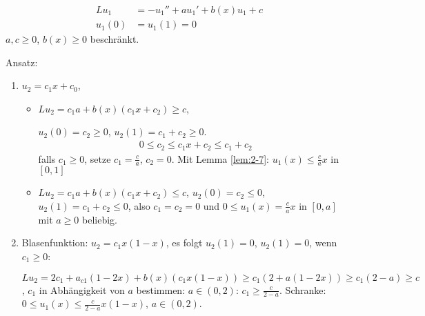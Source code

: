 \begin{beispiel}
  \begin{align*}
    Lu_{1} &= -u_{1}'' + au_{1}' + b(x)u_{1} + c\\
    u_{1}(0) &= u_{1}(1) = 0
  \end{align*}
$a, c \geq 0$, $b(x) \geq 0$ beschränkt. 

Ansatz:
\begin{enumerate}
\item $u_{2} = c_{1}x + c_{0}$,
  \begin{itemize}
  \item $Lu_{2} = c_{1} a + b(x)(c_{1}x + c_{2})\geq c$,

$u_{2}(0) = c_{2} \geq 0$, $u_{2}(1) = c_{1} + c_{2} \geq 0$.
\begin{align*}
  0 \leq c_{2} \leq c_{1}x + c_{2}\leq c_{1} + c_{2}
\end{align*}
falls $c_{1}\geq 0$, setze $c_{1} = \frac ca$, $c_{2} = 0$. 
Mit Lemma \ref{lem:2-7}: $u_{1}(x) \leq \frac c a x$ in $[0, 1]$
\item $Lu_{2} = c_{1} a + b(x)(c_{1}x + c_{2})\leq c$, 
$u_{2}(0) = c_{2} \leq 0$, $u_{2}(1) = c_{1} + c_{2} \leq 0$, also $c_{1} = c_{2} = 0$ und $0\leq u_{1}(x) = \frac c a x$ in $[0, a]$ mit $a \geq 0$ beliebig. 
  \end{itemize}
\item Blasenfunktion: $u_{2} = c_{1}x (1 - x)$, es folgt $u_{2}(1) = 0$, $u_{2}(1) = 0$, 
wenn $c_{1} \geq 0$:

$Lu_{2} = 2c_{1} + a_{c1}(1 - 2x) + b(x)(c_{1}x(1-x))\geq c_{1}(2 + a(1-2x))\geq c_{1}(2 - a)\geq c$, 
$c_{1}$ in Abhängigkeit von $a$ bestimmen: 
$a \in (0, 2)$: $c_{1} \geq \frac c {2-a}$. Schranke: $0 \leq u_{1}(x) \leq \frac c{2-a} x(1 - x)$, $a \in (0, 2)$. 
\end{enumerate}
\end{beispiel}

